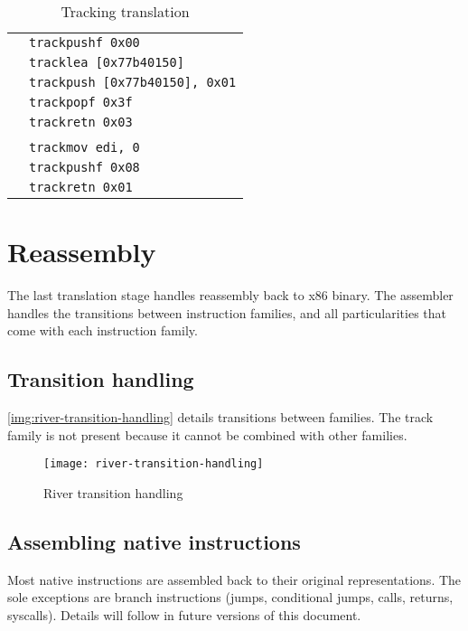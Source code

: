 \documentclass[12pt]{report}
\begin{document}
\begin{table}[H]
\begin{tabular}{| p{9.7cm} | l |}
															    & \texttt{trackpushf 0x00}\\
															    & \texttt{tracklea [0x77b40150]}\\
															    & \texttt{trackpush [0x77b40150], 0x01}\\
															    & \texttt{trackpopf 0x3f}\\
															    & \texttt{trackretn 0x03}\\
															    &\\
															    & \texttt{trackmov edi, 0}\\
															    & \texttt{trackpushf 0x08}\\
															    & \texttt{trackretn 0x01}\\ \hline
	\end{tabular}
	\caption{Tracking translation}
\end{table}

\section{Reassembly}
\label{sec:reassembly}
The last translation stage handles reassembly back to x86 binary. The assembler handles the transitions between instruction families, and all particularities that come with each instruction family.\\

\subsection{Transition handling}
\autoref{img:river-transition-handling} details transitions between families. The track family is not present because it cannot be combined with other families.\\
\begin{figure}[h]
	\texttt{[image: river-transition-handling]}
	\label{img:river-transition-handling}
	\caption{River transition handling}
\end{figure}

\subsection{Assembling native instructions}
\label{ssec:assembling-native-instructions}
Most native instructions are assembled back to their original representations. The sole exceptions are branch instructions (jumps, conditional jumps, calls, returns, syscalls). Details will follow in future versions of this document.\\
\end{document}
